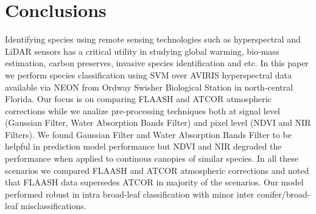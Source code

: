 \documentclass[remotesensing,article,accept,moreauthors,pdftex,12pt,a4paper]{mdpi}
\newcommand\red[1]{\textcolor{red}{#1}} %
\begin{document}
% 
% 










\section{Conclusions}

Identifying species using remote sensing technologies such as hyperspectral and LiDAR sensors has a critical utility in studying global warming, bio-mass estimation, carbon preserves, invasive species identification and etc. 
In this paper we perform species classification using SVM over AVIRIS hyperspectral data available via NEON from Ordway Swisher Biological Station in north-central Florida.
Our focus is on comparing FLAASH and ATCOR atmospheric corrections while we analize pre-processing techniques both at signal level (Gaussian Filter, Water Absorption Bands Filter) and pixel level (NDVI and NIR Filters).
We found Gaussian Filter and Water Absorption Bands Filter to be helpful in prediction model performance but NDVI and NIR degraded the performance when applied to continous canopies of similar species. 
In all these scenarios we compared FLAASH and ATCOR atmospheric corrections and noted that FLAASH data supersedes ATCOR in majority of the scenarios.
Our model performed robust in intra broad-leaf classification with minor inter conifer/broad-leaf misclassifications.
\end{document}
